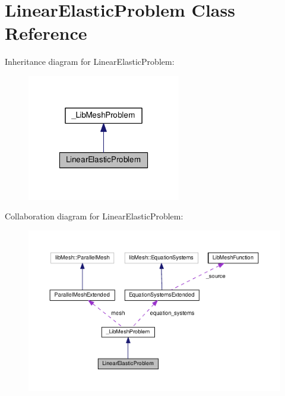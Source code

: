 \hypertarget{class_linear_elastic_problem}{\section{Linear\-Elastic\-Problem Class Reference}
\label{class_linear_elastic_problem}
}


Inheritance diagram for Linear\-Elastic\-Problem\-:\nopagebreak
\begin{figure}[H]
\begin{center}
\leavevmode
\includegraphics[width=190pt]{class_linear_elastic_problem__inherit__graph}
\end{center}
\end{figure}


Collaboration diagram for Linear\-Elastic\-Problem\-:\nopagebreak
\begin{figure}[H]
\begin{center}
\leavevmode
\includegraphics[width=350pt]{class_linear_elastic_problem__coll__graph}
\end{center}
\end{figure}
